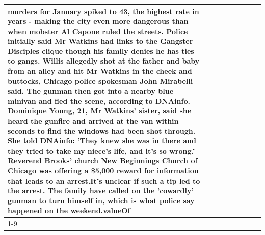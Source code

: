 \begin{table}[H]
\begin{tabular}{lllrlllll}
murders for January spiked to 43, the highest rate in years - making the city even more dangerous than when mobster Al Capone ruled the streets. Police initially said Mr Watkins had links to the Gangster Disciples clique though his family denies he has ties to gangs. Willis allegedly shot at the father and baby from an alley and hit Mr Watkins in the cheek and buttocks, Chicago police spokesman John Mirabelli said. The gunman then got into a nearby blue minivan and fled the scene, according to DNAinfo. Dominique Young, 21, Mr Watkins' sister, said she heard the gunfire and arrived at the van within seconds to find the windows had been shot through. She told DNAinfo: 'They knew she was in there and they tried to take my niece's life, and it's so wrong.' Reverend Brooks' church New Beginnings Church of Chicago was offering a \$5,000 reward for information that leads to an arrest.It's unclear if such a tip led to the arrest. The family have called on the 'cowardly' gunman to turn himself in, which is what police say happened on the weekend.valueOf \\
\cline{1-9}

\end{tabular}
\end{table}
